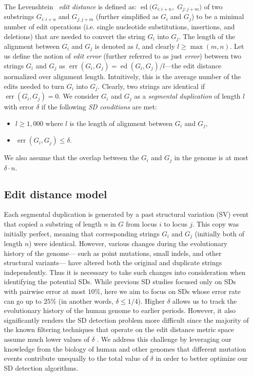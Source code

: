 \documentclass{article}
\DeclareMathOperator{\err}{err}
\DeclareMathOperator{\ed}{ed}
\begin{document}
The Levenshtein~\citep{Levenshtein1966} \emph{edit distance} is defined as: $\ed(G_{i:i+n},$ $G_{j:j+m})$ of two substrings $G_{i:i+n}$ and $G_{j:j+m}$ (further simplified as $G_i$ and $G_j$) to be a minimal number of edit operations (i.e. single nucleotide substitutions, insertions, and deletions) that are needed to convert the string $G_{i}$ into $G_{j}$. The length of the alignment between $G_i$ and $G_j$ is denoted as $l$, and clearly $l\geq \max(m,n)$.
Let us define the notion of \emph{edit error} (further referred to as just \emph{error}) between two strings $G_i$ and $G_j$ as 
$\err(G_i, G_j)=\ed(G_i, G_j)/l$---the edit distance normalized over alignment length. 
Intuitively, this is the average number of the edits needed to turn $G_i$ into $G_j$.
Clearly, two strings are identical if $\err(G_i, G_j)=0$. 
We consider $G_i$ and $G_j$ as a \emph{segmental duplication} of length $l$ with error $\delta$ if the following \emph{SD conditions} are met:
\begin{itemize}
\item $l \geq 1,000$ where $l$ is the length of alignment between $G_i$ and $G_j$,
\item $\err(G_i, G_j)\leq\delta$.
\end{itemize}
We also assume that the overlap between the $G_i$ and $G_j$ in the genome is at most $\delta \cdot n$.

\subsection{Edit distance model}
\label{sec:sdmodel}

Each segmental duplication is generated by a past structural variation (SV) event that copied a substring of length $n$ in $G$ from locus $i$ to locus $j$. This copy was initially perfect, meaning that corresponding strings $G_i$ and $G_j$ (initially both of length $n$) were identical. However, various changes during the evolutionary history of the genome--- such as point mutations, small indels, and  other structural variants--- have altered both the original and duplicate strings independently. Thus it is necessary to take such changes into consideration when identifying the potential SDs. While previous SD studies focused only on SDs with pairwise error at most $10\%$, here we aim to focus on SDs whose error rate can go up to $25\%$ (in another words, $\delta\leq 1/4$). Higher $\delta$ allows us to track the evolutionary history of the human genome to earlier periods. However, it also significantly renders the SD detection problem more difficult since the majority of the known filtering techniques that operate on the edit distance metric space assume much lower values of $\delta$ \citep{Andoni2010}. We address this challenge by leveraging our knowledge from the biology of human and other genomes that different mutation events contribute unequally to the total value of $\delta$ in order to better optimize our SD detection algorithms.
\end{document}
